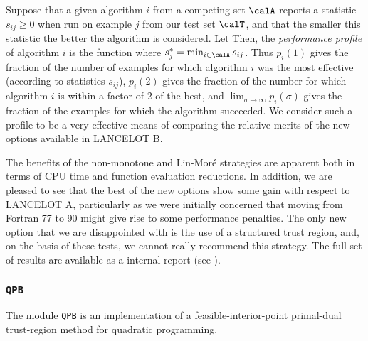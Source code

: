\documentclass[twoside]{article}
\newcommand{\lana}{{\sf LANCELOT A}}
\newcommand{\lanb}{{\sf LANCELOT B}}
\newcommand{\ltsubsubsection}[1]{\subsubsection{{\tt #1}} \label{#1}}
\begin{document}
Suppose that a given algorithm $i$ from a competing set $\calA$
reports a statistic $s_{ij} \geq 0$ 
when run on example $j$ from our test set $\calT$,
and that the smaller this statistic the better the algorithm is considered.
Let 
Then, the {\em performance profile} of algorithm $i$ is the function 
where $s^*_j = \min_{i \in \calA} s_{ij}$.
Thus $p_i(1)$ gives the fraction of the number of examples for which 
algorithm $i$ was the most effective (according to statistics $s_{ij}$),
$p_i(2)$ gives 
the fraction of the number for which algorithm $i$ 
is within a factor of 2 of the best, and $\lim_{\sigma\longrightarrow\infty}
p_i(\sigma)$ gives the fraction of the examples for which the algorithm
succeeded. We consider such a profile to be a very effective means
of comparing the relative merits of the new options available in \lanb.

The benefits of the non-monotone and Lin-Mor\'{e} strategies are
apparent both in terms of CPU time and function evaluation reductions.
In addition, we are pleased to see that 
the best of the new options show some gain with respect to 
\lana, particularly as we were initially concerned that moving from 
Fortran 77 to 90 might give rise to some performance penalties.
The only new option that we are disappointed with is the use of a
structured trust region, and, on the basis of these tests, 
we cannot really recommend this strategy. The full set of results
are available as a internal report (see ).

\ltsubsubsection{QPB}

The module {\tt QPB} is an implementation of a feasible-interior-point
primal-dual trust-region method for quadratic programming.
\end{document}
